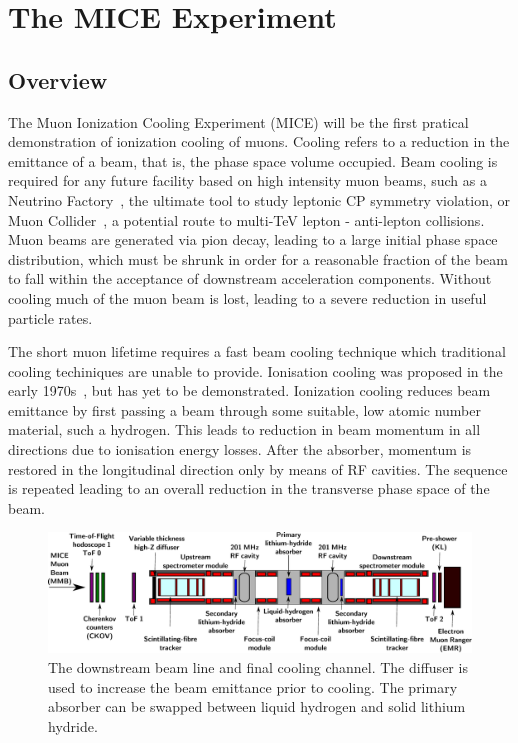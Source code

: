 \section{The MICE Experiment}
\label{sec:MICE}
  \subsection{Overview}
  \label{subsec:Overview}
  The Muon Ionization Cooling Experiment (MICE) will be the first pratical demonstration of ionization cooling of muons. Cooling refers to a reduction in the emittance of a beam, that is, the phase space volume occupied. Beam cooling is required for any future facility based on high intensity muon beams, such as a Neutrino Factory~\cite{ISS-Physics}, the ultimate tool to study leptonic CP symmetry violation, or Muon Collider~\cite{MC_Overview}, a potential route to multi-TeV lepton - anti-lepton collisions. Muon beams are generated via pion decay, leading to a large initial phase space distribution, which must be shrunk in order for a reasonable fraction of the beam to fall within the acceptance of downstream acceleration components. Without cooling much of the muon beam is lost, leading to a severe reduction in useful particle rates.   

  The short muon lifetime requires a fast beam cooling technique which traditional cooling techiniques are unable to provide.  Ionisation cooling was proposed in the early 1970s~\cite{Skrinsky, Neuffer}, but has yet to be demonstrated.  Ionization cooling reduces beam emittance by first passing a beam through some suitable, low atomic number material, such a hydrogen.  This leads to reduction in beam momentum in all directions due to ionisation energy losses.  After the absorber, momentum is restored in the longitudinal direction only by means of RF cavities.  The sequence is repeated leading to an overall reduction in the transverse phase space of the beam.

  \begin{figure}[bht]
    \begin{center}
      \includegraphics[width=1.0\linewidth]{01-MICE/DEMO_CoolingChannel.pdf}
      \caption{\label{fig:CoolingChannel} The downstream beam line and final cooling channel. The diffuser is used to increase the beam emittance prior to cooling. The primary absorber can be swapped between liquid hydrogen and solid lithium hydride.}
    \end{center}
  \end{figure}

